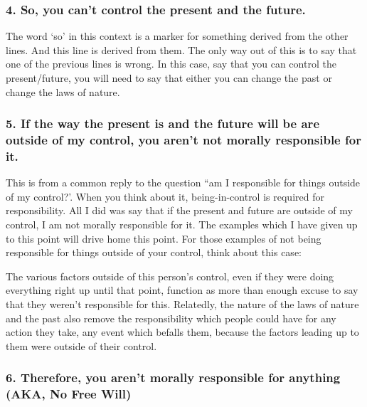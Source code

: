 \subsubsection{4. So, you can't control the present and the future.}

The word ‘so’ in this context is a marker for something derived from the other lines. And this line is derived from them. The only way out of this is to say that one of the previous lines is wrong. In this case, say that you can control the present/future, you will need to say that either you can change the past or change the laws of nature.
\subsubsection{5. If the way the present is and the future will be are outside of my control, you aren't not morally responsible for it.}

This is from a common reply to the question “am I responsible for things outside of my control?’. When you think about it,  being-in-control is required for responsibility. All I did was say that if the present and future are outside of my control, I am not morally responsible for it. The examples which I have given up to this point will drive home this point. For those examples of not being responsible for things outside of your control, think about this case:


 The various factors outside of this person's control, even if they were doing everything right up until that point, function as more than enough excuse to say that they weren't responsible for this. Relatedly, the nature of the laws of nature and the past also remove the responsibility which people could have for any action they take, any event which befalls them, because the factors leading up to them were outside of their control.
\subsubsection{6. Therefore, you aren't morally responsible for anything (AKA, No Free Will)}

